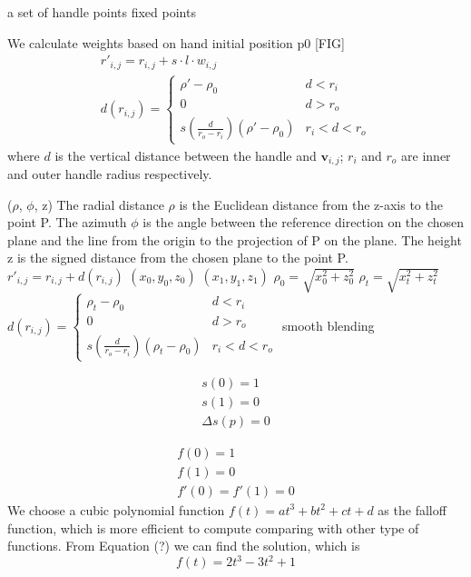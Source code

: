 a set of handle points
fixed points


We calculate weights based on hand initial position p0 [FIG]
\begin{equation}
\begin{split}
r'_{i,j} = r_{i,j} + s \cdot l \cdot w_{i,j} \\
d(r_{i,j}) = \begin{cases}
\rho' - \rho_{0} &  d < r_{i} \\
0 &  d > r_{o} \\
s(\frac{d}{r_{o}-r_{i}}) (\rho' - \rho_{0}) &  r_{i} < d < r_{o}
\end{cases}
\end{split}
\end{equation}
where $d$ is the vertical distance between the handle and $\mathbf{v}_{i,j}$; $r_{i}$ and $r_{o}$ are inner and outer handle radius respectively. 

($\rho$, $\phi$, z) 
The radial distance $\rho$ is the Euclidean distance from the z-axis to the point P.
The azimuth $\phi$ is the angle between the reference direction on the chosen plane and the line from the origin to the projection of P on the plane.
The height z is the signed distance from the chosen plane to the point P.
$r'_{i,j} = r_{i,j} + d(r_{i,j})$
$(x_{0},y_{0},z_{0})$
$(x_{1},y_{1},z_{1})$
$\rho_{0} = \sqrt{x_{0}^2 + z_{0}^2}$
$\rho_{t} = \sqrt{x_{t}^2 + z_{t}^2}$
$d(r_{i,j}) = \begin{cases}

\rho_{t} - \rho_{0} &  d < r_{i} \\
0 &  d > r_{o} \\
s(\frac{d}{r_{o}-r_{i}}) (\rho_{t} - \rho_{0}) &  r_{i} < d < r_{o}
\end{cases}$
smooth blending 

\begin{equation}
\begin{aligned}
s(0) = 1 \\
s(1) = 0 \\ 
\Delta s(p) = 0
\end{aligned}
\end{equation}



\begin{equation}
\begin{aligned}
f(0) = 1 \\
f(1) = 0 \\ 
f'(0) = f'(1) = 0
\end{aligned}
\end{equation}
We choose a cubic polynomial function $f(t) = at^3 + bt^2 + ct + d$ as the falloff function, which is more efficient to compute comparing with other type of functions. From Equation (?) we can find the solution, which is 
\begin{equation}
f(t) = 2t^3 - 3t^2 + 1
\end{equation}

